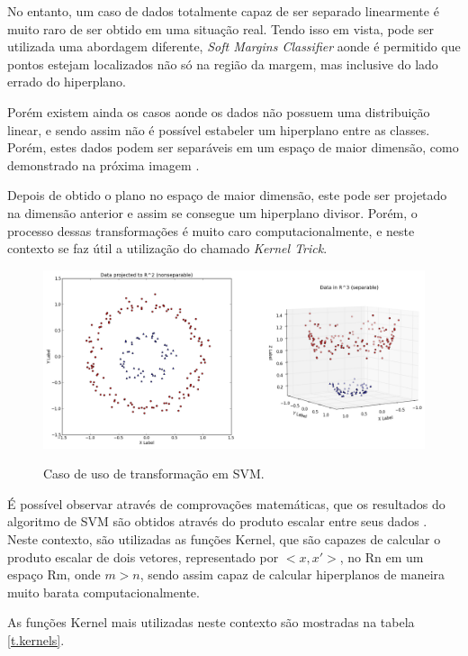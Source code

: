 No entanto, um caso de dados totalmente capaz de ser separado linearmente é muito raro de ser obtido em uma situação real. Tendo isso em vista, pode ser utilizada uma abordagem diferente, \textit{Soft Margins Classifier} aonde é permitido que pontos estejam localizados não só na região da margem, mas inclusive do lado errado do hiperplano. 

Porém existem ainda os casos aonde os dados não possuem uma distribuição linear, e sendo assim não é possível estabeler um hiperplano entre as classes. Porém, estes dados podem ser separáveis em um espaço de maior dimensão, como demonstrado na próxima imagem \cite{kim2013everything}. 

Depois de obtido o plano no espaço de maior dimensão, este pode ser projetado na dimensão anterior e assim se consegue um hiperplano divisor. Porém, o processo dessas transformações é muito caro computacionalmente, e neste contexto se faz útil a utilização do chamado \textit{Kernel Trick}.

\begin{figure}[ht]
\caption{\small Caso de uso de transformação em SVM.}
\centering
\includegraphics[scale=0.40]{figs/svm-2dto3d.png}
\label{f.svm-transformacao}
\end{figure}

É possível observar através de comprovações matemáticas, que os resultados do algoritmo de SVM são obtidos através do produto escalar entre seus dados \cite{jordan2004kernel}. Neste contexto, são utilizadas as funções Kernel, que são capazes de calcular o produto escalar de dois vetores, representado por $<x,x'>$, no Rn em um espaço Rm, onde $m > n$, sendo assim capaz de calcular hiperplanos de maneira muito barata computacionalmente.

As funções Kernel mais utilizadas neste contexto são mostradas na tabela \ref{t.kernels}.

